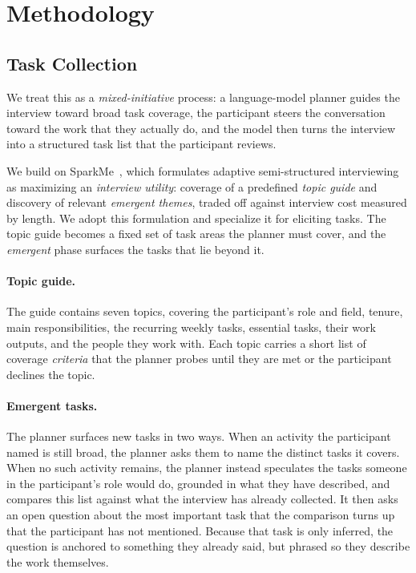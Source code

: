 \section{Methodology}
\subsection{Task Collection}
\label{sec:method:interview}

We treat this as a \emph{mixed-initiative} process: a language-model planner guides the interview toward broad task coverage, the participant steers the conversation toward the work that they actually do, and the model then turns the interview into a structured task list that the participant reviews.

We build on SparkMe~\cite{sparkme}, which formulates adaptive semi-structured interviewing
as maximizing an \emph{interview utility}: coverage of a predefined \emph{topic guide} and
discovery of relevant \emph{emergent themes}, traded off against interview cost measured by
length. We adopt this formulation and specialize it for eliciting tasks. The topic guide
becomes a fixed set of task areas the planner must cover, and the \emph{emergent} phase
surfaces the tasks that lie beyond it.

\paragraph{Topic guide.}
The guide contains seven topics, covering the participant's role and field, tenure, main responsibilities, the recurring weekly tasks, essential tasks, their work outputs, and the people they work with. Each topic carries a short list of coverage \emph{criteria} that the planner probes until
they are met or the participant declines the topic.

\paragraph{Emergent tasks.}

The planner surfaces new tasks in two ways. When an activity the participant named is still broad, the planner asks them to name the distinct tasks it covers. When no such activity remains, the planner instead speculates the tasks someone in the participant's role would do, grounded in what they have described, and compares this list against what the interview has already collected. It then asks an open question about the most important task that the comparison turns up that the participant has not mentioned. Because that task is only inferred, the question is anchored to something they already said, but phrased so they describe the work themselves.

